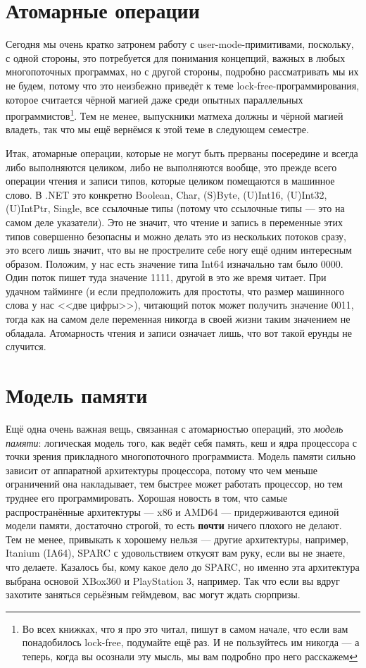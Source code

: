 \documentclass[a5paper]{article}
\begin{document}
\section{Атомарные операции}

Сегодня мы очень кратко затронем работу с user-mode-примитивами, поскольку, с одной стороны, это потребуется для понимания концепций, важных в любых многопоточных программах, но с другой стороны, подробно рассматривать мы их не будем, потому что это неизбежно приведёт к теме lock-free-программирования, которое считается чёрной магией даже среди опытных параллельных программистов\footnote{Во всех книжках, что я про это читал, пишут в самом начале, что если вам понадобилось lock-free, подумайте ещё раз. И не пользуйтесь им никогда --- а теперь, когда вы осознали эту мысль, мы вам подробно про него расскажем}. Тем не менее, выпускники матмеха должны и чёрной магией владеть, так что мы ещё вернёмся к этой теме в следующем семестре.

Итак, атомарные операции, которые не могут быть прерваны посередине и всегда либо выполняются целиком, либо не выполняются вообще, это прежде всего операции чтения и записи типов, которые целиком помещаются в машинное слово. В .NET это конкретно Boolean, Char, (S)Byte, (U)Int16, (U)Int32, (U)IntPtr, Single, все ссылочные типы (потому что ссылочные типы --- это на самом деле указатели). Это не значит, что чтение и запись в переменные этих типов совершенно безопасны и можно делать это из нескольких потоков сразу, это всего лишь значит, что вы не прострелите себе ногу ещё одним интересным образом. Положим, у нас есть значение типа Int64 изначально там было 0000. Один поток пишет туда значение 1111, другой в это же время читает. При удачном тайминге (и если предположить для простоты, что размер машинного слова у нас <<две цифры>>), читающий поток может получить значение 0011, тогда как на самом деле переменная никогда в своей жизни таким значением не обладала. Атомарность чтения и записи означает лишь, что вот такой ерунды не случится.

\section{Модель памяти}

Ещё одна очень важная вещь, связанная с атомарностью операций, это \textit{модель памяти}: логическая модель того, как ведёт себя память, кеш и ядра процессора с точки зрения прикладного многопоточного программиста. Модель памяти сильно зависит от аппаратной архитектуры процессора, потому что чем меньше ограничений она накладывает, тем быстрее может работать процессор, но тем труднее его программировать. Хорошая новость в том, что самые распространённые архитектуры --- x86 и AMD64 --- придерживаются единой модели памяти, достаточно строгой, то есть \textbf{почти} ничего плохого не делают. Тем не менее, привыкать к хорошему нельзя --- другие архитектуры, например, Itanium (IA64), SPARC с удовольствием откусят вам руку, если вы не знаете, что делаете. Казалось бы, кому какое дело до SPARC, но именно эта архитектура выбрана основой XBox360 и PlayStation 3, например. Так что если вы вдруг захотите заняться серьёзным геймдевом, вас могут ждать сюрпризы.
\end{document}
